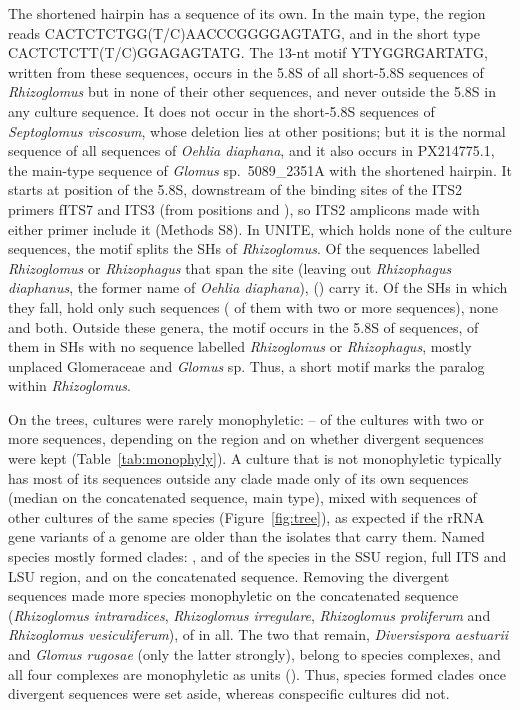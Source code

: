 \documentclass[11pt]{article}
\newcommand{\spn}[1]{\emph{#1}}   %
\begin{document}
The shortened hairpin has a sequence of its own. In the main type, the region reads
CACTCTCTGG(T/C)\allowbreak AACCCGGGGAGTATG, and in the short type CACTCTCTT(T/C)\allowbreak GGAGAGTATG. The 13-nt motif YTYGGRGARTATG, written from these sequences, occurs in
the 5.8S of all \MotifRhizShort{} short-5.8S sequences of \spn{Rhizoglomus} but in none of their other
\MotifRhizOther{} sequences, and never outside the 5.8S in any culture sequence. It does not occur
in the \MotifSeptoShort{} short-5.8S sequences of \spn{Septoglomus viscosum}, whose deletion lies at other
positions; but it is the normal sequence of all \MotifOehlia{} sequences of \spn{Oehlia diaphana}, and it also
occurs in PX214775.1, the main-type sequence of \spn{Glomus} sp.\ 5089\_2351A with the shortened hairpin. It starts at position \MotifStart{} of the 5.8S, downstream of the binding sites of the ITS2
primers fITS7 and ITS3 (from positions \MotifFITSSeven{} and \MotifITSThree{}), so ITS2 amplicons made with either
primer include it (Methods S8). In UNITE, which holds none of the culture sequences, the motif splits the SHs of
\spn{Rhizoglomus}. Of the \UniteRhizCover{} sequences labelled \spn{Rhizoglomus} or \spn{Rhizophagus} that span
the site (leaving out \spn{Rhizophagus diaphanus}, the former name of \spn{Oehlia diaphana}), \UniteRhizShort{}
(\UniteRhizShortPct{}) carry it. Of the \UniteSHs{} SHs in which they fall, \UniteSHShort{} hold only such sequences
(\UniteSHShortMulti{} of them with two or more sequences), \UniteSHMain{} none and \UniteSHMixed{} both. Outside these
genera, the motif occurs in the 5.8S of \UniteOther{} sequences, \UniteOtherNoRhizSH{} of them in SHs with no
sequence labelled \spn{Rhizoglomus} or \spn{Rhizophagus}, mostly unplaced Glomeraceae and \spn{Glomus} sp. Thus, a
short motif marks the paralog within \spn{Rhizoglomus}.

On the trees, cultures were rarely monophyletic: \MonoCultPctMin{}--\MonoCultPctMax{} of the \MonoCultN{} cultures
with two or more sequences, depending on the region and on whether divergent sequences were kept
(Table~\ref{tab:monophyly}). A culture that is not monophyletic typically has most of its sequences outside any
clade made only of its own sequences (median \MonoCultEscMedian{} on the concatenated sequence, main type), mixed
with sequences of other cultures of the same species (Figure~\ref{fig:tree}), as expected if the rRNA gene variants
of a genome are older than the isolates that carry them. Named species mostly formed clades: \MonoSpSSUAll{},
\MonoSpITSAll{} and \MonoSpLSUAll{} of the \NSpecies{} species in the SSU region, full ITS and LSU region, and
\MonoSpLinkedAll{} on the concatenated sequence. Removing the divergent sequences made \MonoFixedN{} more species
monophyletic on the concatenated sequence (\spn{Rhizoglomus intraradices}, \spn{Rhizoglomus irregulare},
\spn{Rhizoglomus proliferum} and \spn{Rhizoglomus vesiculiferum}), \MonoSpLinkedMain{} of \NSpecies{} in all. The two
that remain, \spn{Diversispora aestuarii} and \spn{Glomus rugosae} (only the latter strongly), belong to species
complexes, and all four complexes are monophyletic as units (\MonoComplexLinkedMain{}). Thus, species formed clades
once divergent sequences were set aside, whereas conspecific cultures did not.

\end{document}
